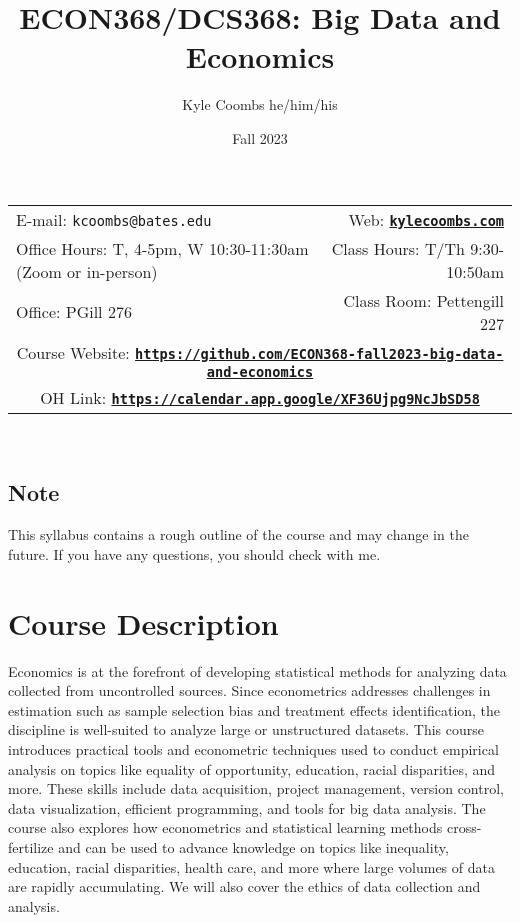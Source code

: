 \documentclass[11pt]{article}
\title{ECON368/DCS368: Big Data and Economics}
\author{Kyle Coombs he/him/his}
\date{Fall 2023}
\begin{document}
\maketitle

\begin{tabular*}{\textwidth}{@{\extracolsep{\fill}}lr}
  
E-mail: \texttt{kcoombs@bates.edu} & Web: \href{kylecoombs.com}{\tt\bf kylecoombs.com} \\

  Office Hours: T, 4-5pm, W 10:30-11:30am  (Zoom or in-person)  &  Class Hours: T/Th 9:30-10:50am \\
  Office: PGill 276 & Class Room: Pettengill 227 \\ 
  \multicolumn{2}{c}{Course Website: \href{https://github.com/ECON368-fall2023-big-data-and-economics}{\tt\bf https://github.com/ECON368-fall2023-big-data-and-economics}} \\
  \multicolumn{2}{c}{OH Link: \href{https://calendar.app.google/XF36Ujpg9NcJbSD58
  }{\tt\bf https://calendar.app.google/XF36Ujpg9NcJbSD58}} \\
\hline
\end{tabular*} \\
  
\subsection*{Note}
\label{sec:note}

This syllabus contains a rough outline of the course and may change in the future.  If you have any questions, you should check with me.

\section*{Course Description}
\label{sec:desc}

Economics is at the forefront of developing statistical methods for analyzing data collected from uncontrolled sources. Since econometrics addresses challenges in estimation such as sample selection bias and treatment effects identification, the discipline is well-suited to analyze large or unstructured datasets. This course introduces practical tools and econometric techniques used to conduct empirical analysis on topics like equality of opportunity, education, racial disparities, and more. These skills include data acquisition, project management, version control, data visualization, efficient programming, and tools for big data analysis. The course also explores how econometrics and statistical learning methods cross-fertilize and can be used to advance knowledge on topics like inequality, education, racial disparities, health care, and more where large volumes of data are rapidly accumulating. We will also cover the ethics of data collection and analysis. 
\end{document}
